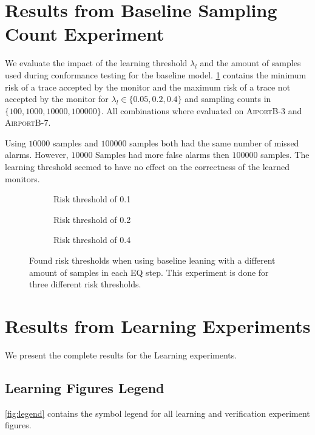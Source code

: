 \documentclass[runningheads]{llncs}
\begin{document}
{\section{Results from Baseline Sampling Count Experiment}\label{sec:ressampling}
We evaluate the impact of the learning threshold $\lambda_l$ and the amount of samples used during conformance testing for the baseline model. \cref{fig:samplingn} contains the minimum risk of a trace accepted by the monitor and the maximum risk of a trace not accepted by the monitor for
$\lambda_l \in \{0.05, 0.2, 0.4\}$ and sampling counts in $\{100,1000,10000,100000\}$. All combinations where evaluated on \textsc{AiportB-3} and \textsc{AirportB-7}.

Using $10000$ samples and $100000$ samples both had the same number of missed alarms. However, $10000$ Samples had more false alarms then $100000$ samples. The learning threshold seemed to have no effect on the correctness of the learned monitors.
\begin{figure}[h]
    \begin{subfigure}{.5\linewidth}
        \resizebox{\linewidth}{!}{
            
        }
        \caption{Risk threshold of 0.1}
    \end{subfigure}
    \begin{subfigure}{.5\linewidth}
        \resizebox{\linewidth}{!}{
            
        }
        \caption{Risk threshold of 0.2}
    \end{subfigure}
    \begin{subfigure}{.5\linewidth}
        \resizebox{\linewidth}{!}{
            
        }
        \caption{Risk threshold of 0.4}
    \end{subfigure}
    \caption{Found risk thresholds when using baseline leaning with a different amount of samples in each EQ step. This experiment is done for three different risk thresholds.}
    \label{fig:samplingn}
\end{figure}



\section{Results from Learning Experiments}\label{sec:reslearn}

We present the complete results for the Learning experiments.

\subsection{Learning Figures Legend}\label{app:learnlegend}
\cref{fig:legend} contains the symbol legend for all learning and verification experiment figures.

}
\end{document}
